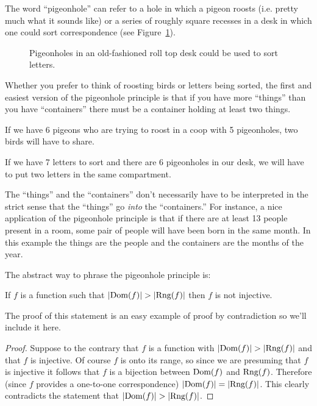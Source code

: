 The word  ``pigeonhole'' can refer to a hole in which a pigeon roosts
(i.e. pretty much what it sounds like) or a series of roughly square 
recesses in a desk in which one could sort correspondence (see Figure~\ref{fig:roll_top}).

\begin{figure}[!hbtp]
\begin{center}

\end{center}
\caption[A desk with pigeonholes.]{Pigeonholes in an old-fashioned roll top
desk could be used to sort letters.}
\label{fig:roll_top} 
\end{figure}

Whether you prefer to think of roosting birds or letters being sorted,
the first and easiest version of the  pigeonhole principle is that if you
have more ``things'' than you have ``containers'' there must be a container
holding at least two things.

If we have 6 pigeons who are trying to roost in a coop with 5 pigeonholes,
two birds will have to share.

If we have 7 letters to sort and there are 6 pigeonholes in our desk, we
will have to put two letters in the same compartment.

The ``things'' and the ``containers'' don't necessarily have to be 
interpreted in the strict sense that the ``things'' go \emph{into} 
the ``containers.''
For instance, a nice application of the pigeonhole principle is that 
if there are at least 13 people present in a room, some pair of people 
will have been born in the same month.  In this example the things are the
people and the containers are the months of the year.

The abstract way to phrase the pigeonhole principle is:

\begin{thm}
If $f$ is a function such that $|\mbox{Dom}(f)| > |\mbox{Rng}(f)|$ then $f$ is not
injective.
\end{thm}

The proof of this statement is an easy example of proof by contradiction
so we'll include it here.

\begin{proof}
Suppose to the contrary that $f$ is a function with 
$|\mbox{Dom}(f)| > |\mbox{Rng}(f)|$ and that $f$ is injective.   Of course
$f$ is onto its range, so since we are presuming that $f$ is injective
it follows that $f$ is a bijection between $\mbox{Dom}(f)$ and $\mbox{Rng}(f)$.  Therefore (since $f$ provides a one-to-one
correspondence) $|\mbox{Dom}(f)| = |\mbox{Rng}(f)|$.  This clearly contradicts the
statement that $|\mbox{Dom}(f)| > |\mbox{Rng}(f)|$.
\end{proof}


